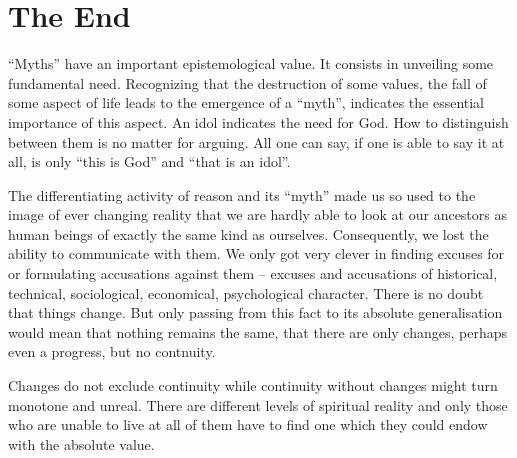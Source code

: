 \section{The End}
``Myths'' have an important epistemological value. It consists in unveiling 
some fundamental need. Recognizing that the destruction of some values, 
the fall of
some aspect of life leads to the emergence of a ``myth'', indicates the 
essential importance of this aspect. An idol indicates the need for God.
How to distinguish between them is no matter for arguing. All one can say, 
if one is able to say it at all, is only ``this is God'' and ``that is an idol''.

The differentiating activity of reason and its ``myth'' made us so 
used to the image of ever changing reality that we are hardly able to look at
our ancestors as human beings of exactly the same kind as ourselves. 
Consequently, we lost the ability to communicate with them. We only 
got very clever in finding excuses for or formulating accusations against them --
excuses and accusations of historical, technical, sociological, economical, 
psychological character. There is no doubt that things change. But only passing
from this fact to its absolute generalisation would mean that nothing remains 
the same, that there are only changes, perhaps even a progress, but no 
contnuity. 

Changes do not exclude continuity while continuity
without changes might turn monotone and unreal. 
There are different levels of spiritual
reality and only those who are unable to live at all of them have to find one
which they could endow with the absolute value.

